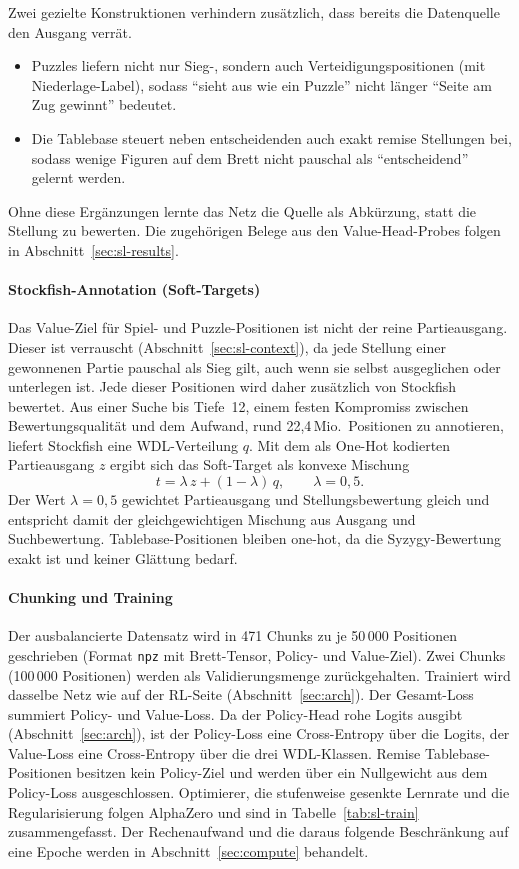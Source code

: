 \documentclass[
  a4paper, 12pt,
  parskip=half,
  headings=small,
  bibliography=totoc
]{scrartcl}
\begin{document}
Zwei gezielte Konstruktionen verhindern zusätzlich, dass bereits die Datenquelle
den Ausgang verrät.
\begin{itemize}
  \item Puzzles liefern nicht nur Sieg-, sondern auch Verteidigungspositionen
        (mit Niederlage-Label), sodass \enquote{sieht aus wie ein Puzzle} nicht länger
        \enquote{Seite am Zug gewinnt} bedeutet.
  \item Die Tablebase steuert neben entscheidenden auch exakt remise Stellungen
        bei, sodass wenige Figuren auf dem Brett nicht pauschal als
        \enquote{entscheidend} gelernt werden.
\end{itemize}
Ohne diese Ergänzungen lernte das Netz die Quelle als Abkürzung, statt die Stellung
zu bewerten. Die zugehörigen Belege aus den Value-Head-Probes folgen in
Abschnitt~\ref{sec:sl-results}.

\paragraph{Stockfish-Annotation (Soft-Targets)}
Das Value-Ziel für Spiel- und Puzzle-Positionen ist nicht der reine Partieausgang.
Dieser ist verrauscht (Abschnitt~\ref{sec:sl-context}), da jede Stellung einer
gewonnenen Partie pauschal als Sieg gilt, auch wenn sie selbst ausgeglichen oder
unterlegen ist. Jede dieser Positionen wird daher zusätzlich von Stockfish
bewertet. Aus einer Suche bis Tiefe~12, einem festen Kompromiss zwischen
Bewertungsqualität und dem Aufwand, rund 22{,}4\,Mio.\ Positionen zu annotieren,
liefert Stockfish eine WDL-Verteilung \(q\). Mit dem als One-Hot kodierten
Partieausgang \(z\) ergibt sich das Soft-Target als konvexe Mischung
\[
  t = \lambda\, z + (1-\lambda)\, q, \qquad \lambda = 0{,}5 .
\]
Der Wert \(\lambda = 0{,}5\) gewichtet Partieausgang und Stellungsbewertung gleich
und entspricht damit der gleichgewichtigen Mischung aus Ausgang und Suchbewertung. Tablebase-Positionen bleiben one-hot, da die
Syzygy-Bewertung exakt ist und keiner Glättung bedarf.

\paragraph{Chunking und Training}
Der ausbalancierte Datensatz wird in 471 Chunks zu je 50\,000 Positionen geschrieben
(Format \texttt{npz} mit Brett-Tensor, Policy- und Value-Ziel). Zwei Chunks
(100\,000 Positionen) werden als Validierungsmenge zurückgehalten. Trainiert wird
dasselbe Netz wie auf der RL-Seite (Abschnitt~\ref{sec:arch}). Der Gesamt-Loss
summiert Policy- und Value-Loss. Da der Policy-Head rohe Logits ausgibt
(Abschnitt~\ref{sec:arch}), ist der Policy-Loss eine Cross-Entropy über die Logits,
der Value-Loss eine Cross-Entropy über die drei WDL-Klassen. Remise
Tablebase-Positionen besitzen kein Policy-Ziel und werden über ein Nullgewicht aus
dem Policy-Loss ausgeschlossen. Optimierer, die stufenweise gesenkte
Lernrate und die Regularisierung folgen AlphaZero \parencite{silver2018} und sind
in Tabelle~\ref{tab:sl-train} zusammengefasst. Der Rechenaufwand und die daraus
folgende Beschränkung auf eine Epoche werden in Abschnitt~\ref{sec:compute}
behandelt.
\end{document}
